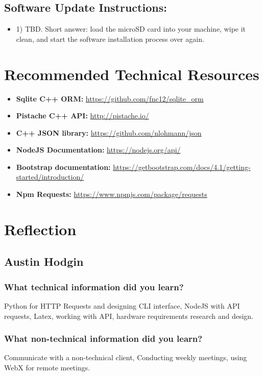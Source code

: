\documentclass[onecolumn, draftclsnofoot,10pt, compsoc]{IEEEtran}
\begin{document}
	\subsection{\textbf{Software Update Instructions:}}
	\begin{itemize}
		\item 1) TBD. Short answer: load the microSD card into your machine, wipe it clean, and start the software installation process over again.
	\end{itemize}


	\section{Recommended Technical Resources}
	\begin{itemize}
		\item \textbf{Sqlite C++ ORM:} \url{https://github.com/fnc12/sqlite_orm}
		\item \textbf{Pistache C++ API:} \url{http://pistache.io/}
		\item \textbf{C++ JSON library:} \url{https://github.com/nlohmann/json}
		\item \textbf{NodeJS Documentation:} \url{https://nodejs.org/api/}
		\item \textbf{Bootstrap documentation:} \url{https://getbootstrap.com/docs/4.1/getting-started/introduction/}
		\item \textbf{Npm Requests:} \url{https://www.npmjs.com/package/requests}
	\end{itemize}


	\section{Reflection}
		\subsection{Austin Hodgin}
			\subsubsection{What technical information did you learn?}
			Python for HTTP Requests and designing CLI interface, NodeJS with API requests, Latex, working with API, hardware requirements research and design.
			\subsubsection{What non-technical information did you learn?}
			Communicate with a non-technical client, Conducting weekly meetings, using WebX for remote meetings.
\end{document}
